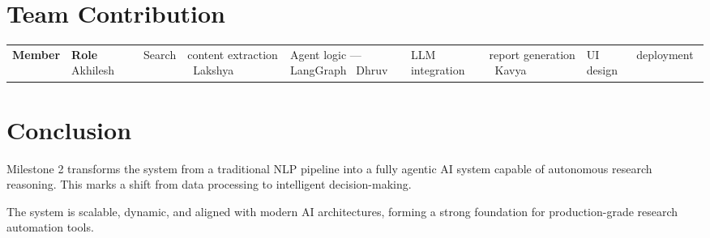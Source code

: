 \documentclass[11pt]{article}
\begin{document}
\section{Team Contribution}

\begin{tabular}{ll}
\toprule
\textbf{Member} & \textbf{Role} \
\midrule
Akhilesh & Search & content extraction \
Lakshya & Agent logic — LangGraph \
Dhruv & LLM integration & report generation \
Kavya & UI design & deployment \
\bottomrule
\end{tabular}

\section{Conclusion}

Milestone 2 transforms the system from a traditional NLP pipeline into a fully agentic AI system capable of autonomous research reasoning. This marks a shift from data processing to intelligent decision-making.

The system is scalable, dynamic, and aligned with modern AI architectures, forming a strong foundation for production-grade research automation tools.
\end{document}
